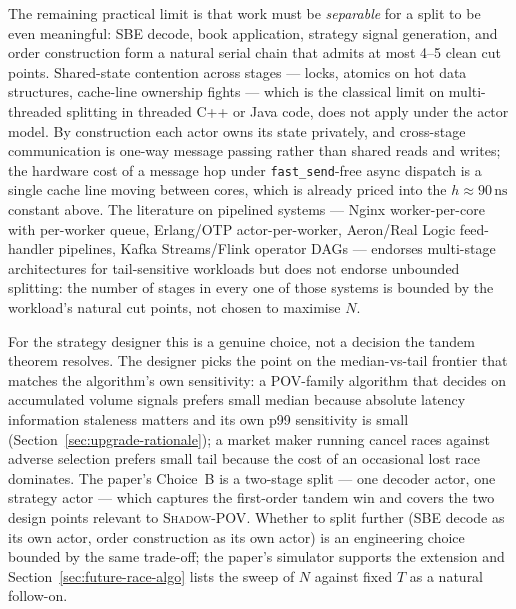 \documentclass[11pt]{article}
\newcommand{\shadowpov}{\textsc{Shadow-POV}}
\begin{document}
The remaining practical limit is that work must be \emph{separable} for a split to be even meaningful: SBE decode, book application, strategy signal generation, and order construction form a natural serial chain that admits at most 4--5 clean cut points. Shared-state contention across stages --- locks, atomics on hot data structures, cache-line ownership fights --- which is the classical limit on multi-threaded splitting in threaded C++ or Java code, does not apply under the actor model. By construction each actor owns its state privately, and cross-stage communication is one-way message passing rather than shared reads and writes; the hardware cost of a message hop under \texttt{fast\_send}-free async dispatch is a single cache line moving between cores, which is already priced into the $h \approx 90\,\mathrm{ns}$ constant above. The literature on pipelined systems --- Nginx worker-per-core with per-worker queue, Erlang/OTP actor-per-worker, Aeron/Real Logic feed-handler pipelines, Kafka Streams/Flink operator DAGs --- endorses multi-stage architectures for tail-sensitive workloads but does not endorse unbounded splitting: the number of stages in every one of those systems is bounded by the workload's natural cut points, not chosen to maximise $N$.

For the strategy designer this is a genuine choice, not a decision the tandem theorem resolves. The designer picks the point on the median-vs-tail frontier that matches the algorithm's own sensitivity: a POV-family algorithm that decides on accumulated volume signals prefers small median because absolute latency information staleness matters and its own p99 sensitivity is small (Section~\ref{sec:upgrade-rationale}); a market maker running cancel races against adverse selection prefers small tail because the cost of an occasional lost race dominates. The paper's Choice~B is a two-stage split --- one decoder actor, one strategy actor --- which captures the first-order tandem win and covers the two design points relevant to \shadowpov{}. Whether to split further (SBE decode as its own actor, order construction as its own actor) is an engineering choice bounded by the same trade-off; the paper's simulator supports the extension and Section~\ref{sec:future-race-algo} lists the sweep of $N$ against fixed $T$ as a natural follow-on.
\end{document}
